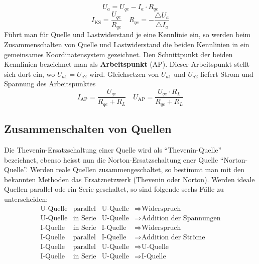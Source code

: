 \begin{equation}
\boxed{U_a=U_{qe}-I_a\cdot R_{qe}}
\end{equation}
\begin{equation}
\boxed{I_{\text{KS}}=\dfrac{U_{qe}}{R_{qe}}}\quad \boxed{R_{qe}=-\dfrac{\triangle U_a}{\triangle I_a}}
\end{equation}
Führt man für Quelle und Lastwiderstand je eine Kennlinie ein, so werden beim Zusammenschalten von Quelle und Lastwiderstand die beiden Kennlinien in ein gemeinsames Koordinatensystem gezeichnet. Den Schnittpunkt der beiden Kennlinien bezeichnet man als \textbf{Arbeitspunkt} (AP). Dieser Arbeitspunkt stellt sich dort ein, wo $U_{a1}=U_{a2}$ wird.
\newline\newline
Gleichsetzen von $U_{a1}$ und $U_{a2}$ liefert Strom und Spannung des Arbeitspunktes
\begin{equation}
\boxed{I_{\text{AP}}=\dfrac{U_{qe}}{R_{qe}+R_L}}\quad \boxed{U_{\text{AP}}=\dfrac{U_{qe}\cdot R_L}{R_{qe}+R_L}}
\end{equation}
\subsection{Zusammenschalten von Quellen}
Die Thevenin-Ersatzschaltung einer Quelle wird als ``Thevenin-Quelle'' bezeichnet, ebenso heisst nun die Norton-Ersatzschaltung ener Quelle ``Norton-Quelle''. Werden reale Quellen zusammengeschaltet, so bestimmt man mit den bekannten Methoden das Ersatznetzwerk (Thevenin oder Norton). Werden ideale Quellen parallel ode rin Serie geschaltet, so sind folgende sechs Fälle zu unterscheiden:
\begin{equation}
\boxed{
    \begin{array}{llll}
    \text{U-Quelle}&\text{parallel}&\text{U-Quelle}&\Rightarrow \text{Widerspruch}\\
    \text{U-Quelle}&\text{in Serie}&\text{U-Quelle}&\Rightarrow \text{Addition der Spannungen}\\
    \text{I-Quelle}&\text{in Serie}&\text{I-Quelle}&\Rightarrow \text{Widerspruch}\\
    \text{I-Quelle}&\text{parallel}&\text{I-Quelle}&\Rightarrow \text{Addition der Ströme}\\
    \text{I-Quelle}&\text{parallel}&\text{U-Quelle}&\Rightarrow \text{U-Quelle}\\
    \text{I-Quelle}&\text{in Serie}&\text{U-Quelle}&\Rightarrow \text{I-Quelle}\\
    \end{array}
}
\end{equation}
